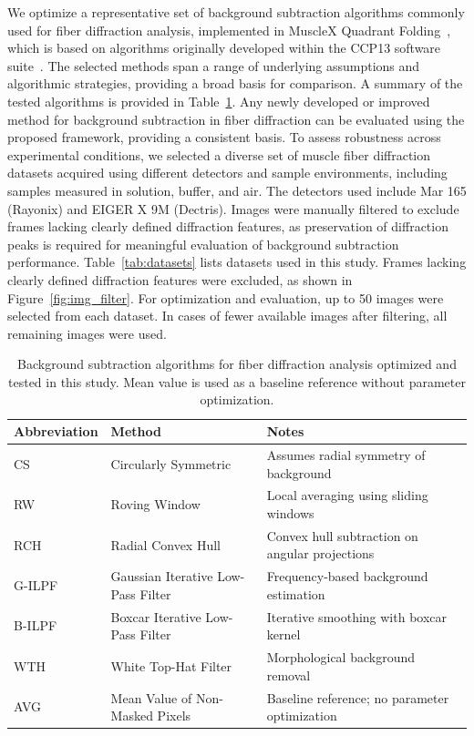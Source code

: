 \documentclass[iucr]{iucrjournals}
\begin{document}
We optimize a representative set of background subtraction algorithms commonly used for fiber diffraction analysis, implemented in MuscleX Quadrant Folding~\cite{JiratrakanvongEtAl2024}, which is based on algorithms originally developed within the CCP13 software suite~\cite{HeEtAl2007}. The selected methods span a range of underlying assumptions and algorithmic strategies, providing a broad basis for comparison. A summary of the tested algorithms is provided in Table~\ref{tab:algorithms}. Any newly developed or improved method for background subtraction in fiber diffraction can be evaluated using the proposed framework, providing a consistent basis. To assess robustness across experimental conditions, we selected a diverse set of muscle fiber diffraction datasets acquired using different detectors and sample environments, including samples measured in solution, buffer, and air. The detectors used include Mar 165 (Rayonix) and EIGER X 9M (Dectris). Images were manually filtered to exclude frames lacking clearly defined diffraction features, as preservation of diffraction peaks is required for meaningful evaluation of background subtraction performance. Table~\ref{tab:datasets} lists datasets used in this study. Frames lacking clearly defined diffraction features were excluded, as shown in Figure~\ref{fig:img_filter}. For optimization and evaluation, up to 50 images were selected from each dataset. In cases of fewer available images after filtering, all remaining images were used.

\begin{table}[t]
\caption{Background subtraction algorithms for fiber diffraction analysis optimized and tested in this study. Mean value is used as a baseline reference without parameter optimization.}
\label{tab:algorithms}
\centering
\small
\setlength{\tabcolsep}{6pt}
\renewcommand{\arraystretch}{1.1}
\begin{tabular}{@{}lll@{}}
\toprule
\textbf{Abbreviation} & \textbf{Method} & \textbf{Notes} \\
\midrule
CS & Circularly Symmetric & Assumes radial symmetry of background \\
RW & Roving Window & Local averaging using sliding windows \\
RCH & Radial Convex Hull & Convex hull subtraction on angular projections \\
G-ILPF & Gaussian Iterative Low-Pass Filter & Frequency-based background estimation \\
B-ILPF & Boxcar Iterative Low-Pass Filter & Iterative smoothing with boxcar kernel \\
WTH & White Top-Hat Filter & Morphological background removal \\
\midrule
AVG & Mean Value of Non-Masked Pixels & Baseline reference; no parameter optimization \\
\bottomrule
\end{tabular}
\end{table}
\end{document}

